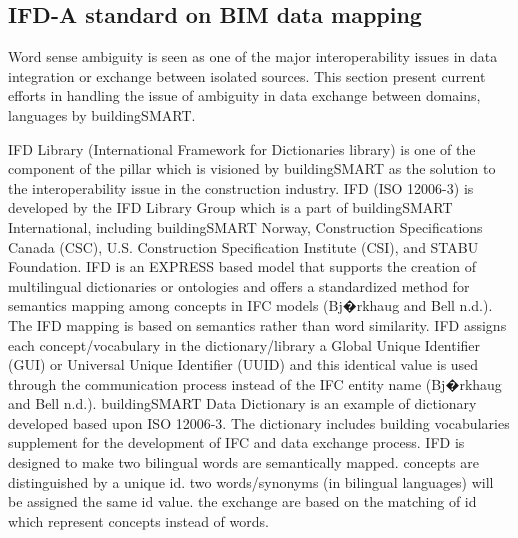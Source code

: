\documentclass[NewProceedings, InsideFigs]{ascelike} %
\begin{document}
\subsection{IFD-A standard on BIM data mapping}
Word sense ambiguity is seen as one of the major interoperability issues in data integration or exchange between isolated sources. This section present current efforts in handling the issue of ambiguity in data exchange between domains, languages by buildingSMART.
\par
IFD Library (International Framework for Dictionaries library) is one of the component of the pillar which is visioned by buildingSMART as the solution to the interoperability issue in the construction industry. IFD (ISO 12006-3) is developed by the IFD Library Group which is a part of buildingSMART International, including buildingSMART Norway, Construction Specifications Canada (CSC), U.S. Construction Specification Institute (CSI), and STABU Foundation.  IFD is an EXPRESS based model that supports the creation of multilingual dictionaries or ontologies and offers a standardized method for semantics mapping among concepts in IFC models (Bj�rkhaug and Bell n.d.). The IFD mapping is based on semantics rather than word similarity. IFD assigns each concept/vocabulary in the dictionary/library a Global Unique Identifier (GUI) or Universal Unique Identifier (UUID) and this identical value is used through the communication process instead of the IFC entity name (Bj�rkhaug and Bell n.d.). buildingSMART Data Dictionary is an example of dictionary developed based upon ISO 12006-3. The dictionary includes building vocabularies supplement for the development of IFC and data exchange process. IFD is designed to make two bilingual words are semantically mapped. concepts are distinguished by a unique id. two words/synonyms (in bilingual languages) will be assigned the same id value. the exchange are based on the matching of id which represent concepts instead of words. 

%
\end{document}
